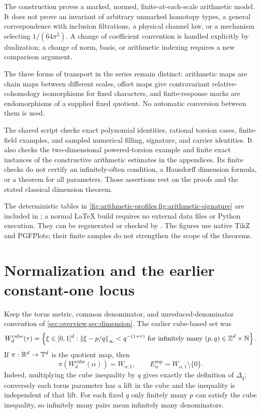 \documentclass[11pt,a4paper]{article}
\begin{document}
The construction proves a marked, normed, finite-at-each-scale arithmetic
model.  It does not prove an invariant of arbitrary unmarked homotopy
types, a general correspondence with inclusion filtrations, a physical
channel law, or a mechanism selecting $1/(64\pi^2)$.  A change of
coefficient convention is handled explicitly by dualization; a change of
norm, basis, or arithmetic indexing requires a new comparison argument.

The three forms of transport in the series remain distinct: arithmetic
maps are chain maps between different scales, offset maps give
contravariant relative-cohomology isomorphisms for fixed characters, and
finite-response marks are endomorphisms of a supplied fixed quotient.
No automatic conversion between them is used.

The shared script  checks exact
polynomial identities, rational torsion cases, finite-field examples,
and sampled numerical filling, signature, and carrier identities.  It
also checks the two-dimensional powered-torsion example and finite exact
instances of the constructive arithmetic estimates in the appendices.  Its
finite checks do not certify an infinitely-often condition, a Hausdorff
dimension formula, or a theorem for all parameters.  Those assertions
rest on the proofs and the stated classical dimension theorem.

The deterministic tables in \cref{fig:arithmetic-profiles,fig:arithmetic-signature}
are included in ; a normal LaTeX
build requires no external data files or Python execution. They can be
regenerated or checked by .
The figures use native TikZ and PGFPlots; their finite samples do not
strengthen the scope of the theorems.

\appendix
\section{Normalization and the earlier constant-one locus}
\label{sec:legacy}

Keep the torus metric, common denominator, and unreduced-denominator
convention of \cref{sec:overview,sec:dimension}.  The earlier cube-based
set was
\[
 W_d^{\mathrm{cube}}(\tau)
 =\left\{\xi\in[0,1]^d:
 \left\lVert\xi-p/q\right\rVert_\infty<q^{-(1+\tau)}
 \text{ for infinitely many }(p,q)\in\mathbb Z^d\times\mathbb N\right\}.
\]
If $\pi:\mathbb R^d\to\mathbb T^d$ is the quotient map, then
\begin{equation}\label{eq:legacy-locus}
 \pi(W_d^{\mathrm{cube}}(\alpha))=W_{\alpha,1},\qquad
 E^{\mathrm{sup}}_\alpha=W_{\alpha,1}\setminus\{0\}.
\end{equation}
Indeed, multiplying the cube inequality by $q$ gives exactly the
definition of $\Delta_q$; conversely each torus parameter has a lift in
the cube and the inequality is independent of that lift.  For each fixed
$q$ only finitely many $p$ can satisfy the cube inequality, so infinitely
many pairs mean infinitely many denominators.
\end{document}
